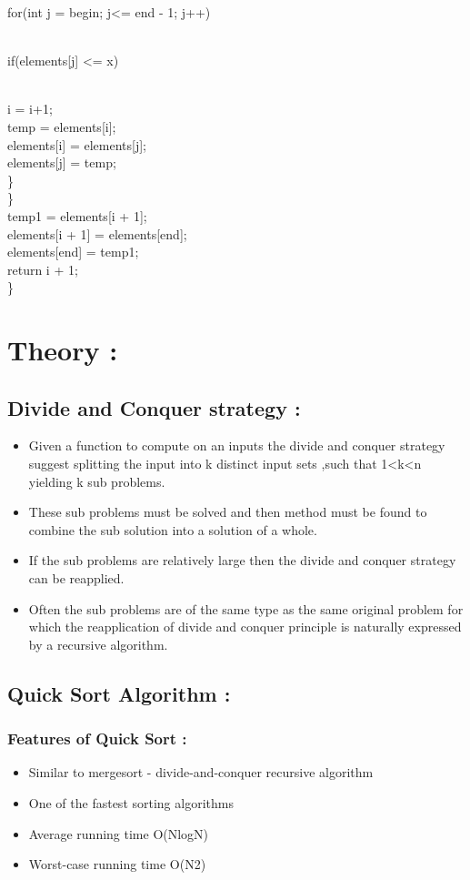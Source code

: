 \documentclass[a4paper,12pt]{article}
\begin{document}
		for(int j = begin; j<= end - 1; j++) {\\
			if(elements[j] <= x) {\\
				i = i+1;\\
				temp = elements[i];\\
				elements[i] = elements[j];\\
				elements[j] = temp;\\
				\}\\
				\}\\
				temp1 = elements[i + 1];\\
				elements[i + 1] = elements[end];\\
				elements[end] = temp1;\\
				return i + 1;\\
				\}\\
	
\section{Theory : }
	\subsection{Divide and Conquer strategy : }
		\begin{itemize}
			\item Given a function to compute on an inputs the divide and conquer strategy suggest splitting the input into k distinct input sets ,such that 1<k<n yielding k sub problems.
			
			\item These sub problems must be solved and then method must be found to combine the sub solution into a solution of a whole.
			
			\item If the sub problems are relatively large then the divide and conquer strategy can be reapplied.
			
			\item Often the sub problems are of the same type as the same original problem for which the reapplication of divide and conquer principle is naturally expressed by a recursive algorithm.
		\end{itemize}
		
	\subsection{Quick Sort Algorithm :}
		\subsubsection{Features of Quick Sort :}
			\begin{itemize}
				\item Similar to mergesort - divide-and-conquer recursive algorithm 
				\item One of the fastest sorting algorithms 
				\item Average running time O(NlogN) 
				\item Worst-case running time O(N2)
			\end{itemize}
		
}}
\end{document}
